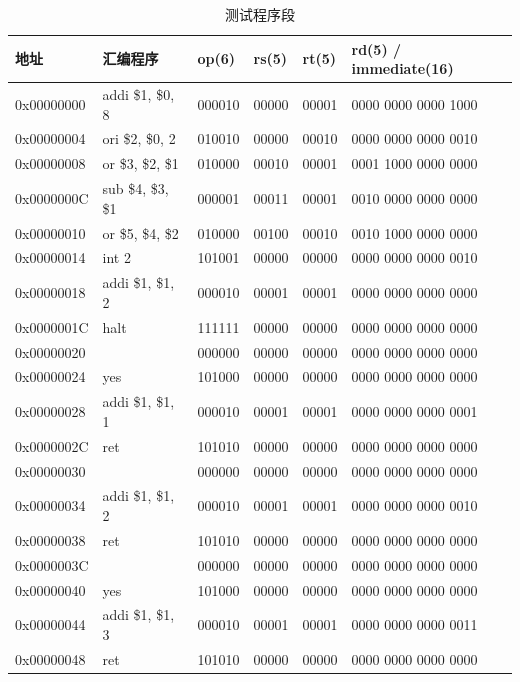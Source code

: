 \documentclass{article}
\begin{document}
\begin{table}[!h]
\centering
\begin{tabular}{|l|l|l|l|l|l|}
\hline
地址 & 汇编程序 & op(6) & rs(5) & rt(5) & rd(5) / immediate(16) \\
\hline
0x00000000 & addi \$1, \$0, 8 & 000010 & 00000 & 00001 & 0000 0000 0000 1000 \\
\hline
0x00000004 & ori \$2, \$0, 2 & 010010 & 00000 & 00010 & 0000 0000 0000 0010 \\
\hline
0x00000008 & or \$3, \$2, \$1 & 010000 & 00010 & 00001 & 0001 1000 0000 0000 \\
\hline
0x0000000C & sub \$4, \$3, \$1 & 000001 & 00011 & 00001 & 0010 0000 0000 0000 \\
\hline
0x00000010 & or \$5, \$4, \$2 & 010000 & 00100 & 00010 & 0010 1000 0000 0000 \\
\hline
0x00000014 & int 2 & 101001 & 00000 & 00000 & 0000 0000 0000 0010 \\
\hline
0x00000018 & addi \$1, \$1, 2 & 000010 & 00001 & 00001 & 0000 0000 0000 0000 \\
\hline
0x0000001C & halt & 111111 & 00000 & 00000 & 0000 0000 0000 0000 \\
\hline
0x00000020 & & 000000 & 00000 & 00000 & 0000 0000 0000 0000 \\
\hline
0x00000024 & yes & 101000 & 00000 & 00000 & 0000 0000 0000 0000 \\
\hline
0x00000028 & addi \$1, \$1, 1 & 000010 & 00001 & 00001 & 0000 0000 0000 0001 \\
\hline
0x0000002C & ret & 101010 & 00000 & 00000 & 0000 0000 0000 0000 \\
\hline
0x00000030 & & 000000 & 00000 & 00000 & 0000 0000 0000 0000 \\
\hline
0x00000034 & addi \$1, \$1, 2 & 000010 & 00001 & 00001 & 0000 0000 0000 0010 \\
\hline
0x00000038 & ret & 101010 & 00000 & 00000 & 0000 0000 0000 0000 \\
\hline
0x0000003C & & 000000 & 00000 & 00000 & 0000 0000 0000 0000 \\
\hline
0x00000040 & yes & 101000 & 00000 & 00000 & 0000 0000 0000 0000 \\
\hline
0x00000044 & addi \$1, \$1, 3 & 000010 & 00001 & 00001 & 0000 0000 0000 0011 \\
\hline
0x00000048 & ret & 101010 & 00000 & 00000 & 0000 0000 0000 0000 \\
\hline

\end{tabular}
\caption{测试程序段}
\label{T1}
\end{table}
\end{document}
